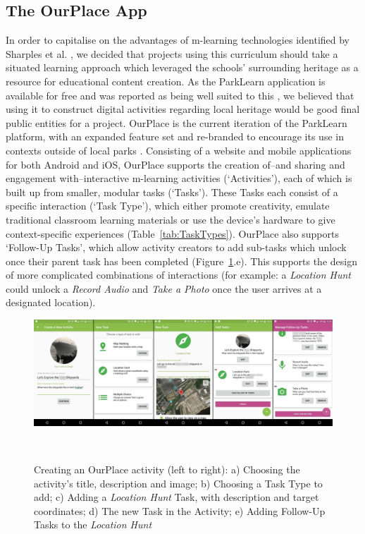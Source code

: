 \documentclass[,hyphens]{sigchi}
\begin{document}
\subsection{The OurPlace App}
In order to capitalise on the advantages of m-learning technologies identified by Sharples et al. \cite{Sharples2007}, we decided that projects using this curriculum should take a situated learning approach which leveraged the schools' surrounding heritage as a resource for educational content creation. As the ParkLearn application is available for free and was reported as being well suited to this \cite{Richardson2018}, we believed that using it to construct digital activities regarding local heritage would be good final public entities for a project. OurPlace is the current iteration of the ParkLearn platform, with an expanded feature set and re-branded to encourage its use in contexts outside of local parks \cite{Richardson2018a}. Consisting of a website and mobile applications for both Android and iOS, OurPlace supports the creation of--and sharing and engagement with--interactive m-learning activities (`Activities'), each of which is built up from smaller, modular tasks (`Tasks'). These Tasks each consist of a specific interaction (`Task Type'), which either promote creativity, emulate traditional classroom learning materials or use the device's hardware to give context-specific experiences (Table~\ref{tab:TaskTypes}). OurPlace also supports `Follow-Up Tasks', which allow activity creators to add sub-tasks which unlock once their parent task has been completed (Figure~\ref{fig:ActivityCreation}.e). This supports the design of more complicated combinations of interactions (for example: a \textit{Location Hunt} could unlock a \textit{Record Audio} and \textit{Take a Photo} once the user arrives at a designated location).

\begin{figure}
  \centering
  \includegraphics[width=2.1\columnwidth]{figures/activityCreation}
  \caption{Creating an OurPlace activity (left to right): a) Choosing the activity's title, description and image; b) Choosing a Task Type to add; c) Adding a \textit{Location Hunt} Task, with description and target coordinates; d) The new Task in the Activity; e) Adding Follow-Up Tasks to the \textit{Location Hunt}  }~\label{fig:ActivityCreation}
  \vspace{-2em}
\end{figure}
\end{document}
